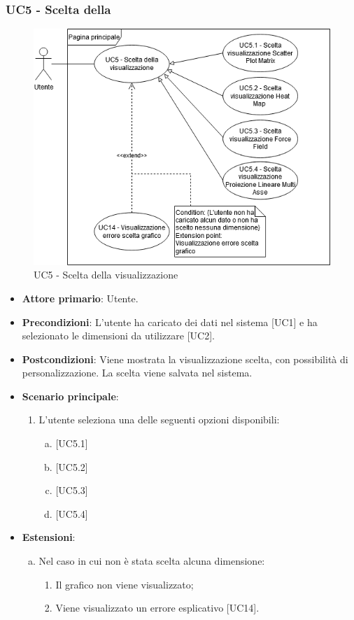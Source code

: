 \subsubsection{UC5 - Scelta della }
\begin{figure}[h]
\includegraphics[width=\linewidth]{section/Images/UC5.png}
\centering
\caption{UC5 - Scelta della visualizzazione}
\end{figure}
\begin{itemize}
	\item \textbf{Attore primario}: Utente.
	\item \textbf{Precondizioni}: L'utente ha caricato dei dati nel sistema [UC1] e ha selezionato le dimensioni da utilizzare [UC2].
	\item \textbf{Postcondizioni}: Viene mostrata la visualizzazione scelta, con possibilità di personalizzazione. La scelta viene salvata nel sistema.
	\item \textbf{Scenario principale}:
\begin{enumerate}
	\item	L'utente seleziona una delle seguenti opzioni disponibili:
		\begin{enumerate}[(a)]
			\item {}
			\item {}
			\item {}
			\item {}
		\end{enumerate}
\end{enumerate}
	\item \textbf{Estensioni}:
	\begin{enumerate}[(a)]
		\item Nel caso in cui non è stata scelta alcuna dimensione:
		\begin{enumerate}[1.]
			\item Il grafico non viene visualizzato;
			\item Viene visualizzato un errore esplicativo [UC14].
		\end{enumerate}
	\end{enumerate}
\end{itemize}